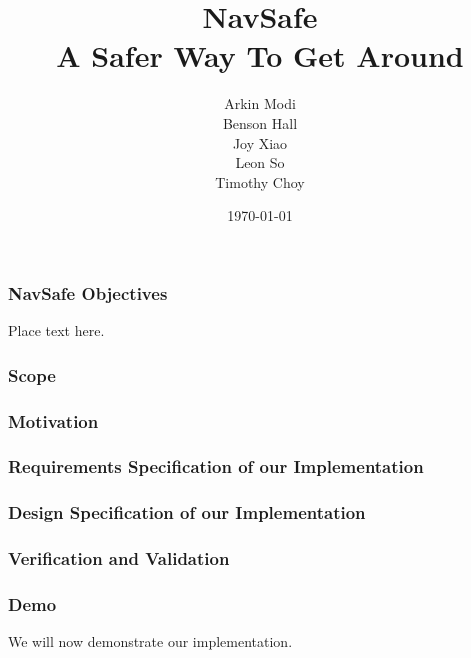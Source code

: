 \documentclass[t,12pt,numbers,fleqn]{beamer}
\title{
    NavSafe\\
    \large A Safer Way To Get Around
}
\author{
    Arkin Modi\\
    Benson Hall\\
    Joy Xiao\\
    Leon So\\
    Timothy Choy
}
\institute{Department of Software and Computing, McMaster University}
\date{\today}
\begin{document}
 
\frame{\titlepage}


\begin{frame}
\frametitle{NavSafe Objectives}
Place text here.
\end{frame}
 
\begin{frame}
\frametitle{Scope}

\end{frame}
\begin{frame}
\frametitle{Motivation}

\end{frame}
\begin{frame}
\frametitle{Requirements Specification of our Implementation}

\end{frame}
\begin{frame}
\frametitle{Design Specification of our Implementation}
    
\end{frame}
\begin{frame}
\frametitle{Verification and Validation}

\end{frame}
\begin{frame}
\frametitle{Demo}
We will now demonstrate our implementation.
\end{frame}
\end{document}
